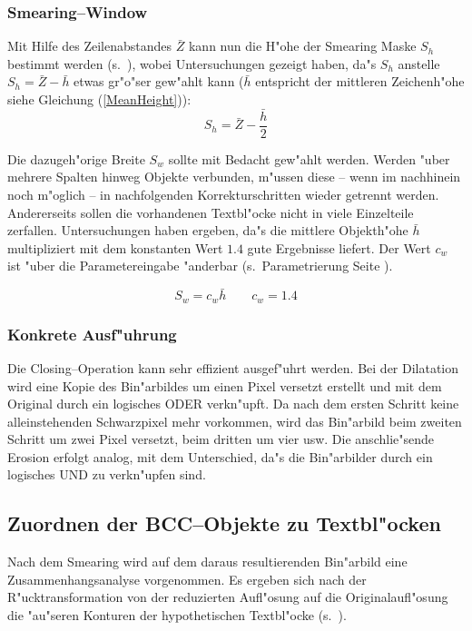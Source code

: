 

\subsubsection{Smearing--Window}

Mit Hilfe des Zeilenabstandes $\bar{Z}$ kann nun die H"ohe der Smearing Maske $S_h$
bestimmt werden (s.\ ), wobei Untersuchungen gezeigt haben, da"s
$S_h$ anstelle $S_h = \bar{Z} - \bar{h}$ etwas gr"o"ser gew"ahlt kann
($\bar{h}$ entspricht der mittleren Zeichenh"ohe siehe Gleichung (\ref{MeanHeight})):
$$S_h = \bar{Z} - \frac{\bar{h}}{2}$$


Die dazugeh"orige Breite $S_w$ sollte mit Bedacht gew"ahlt werden. Werden "uber mehrere
Spalten hinweg Objekte verbunden, m"ussen diese -- wenn im nachhinein noch m"oglich -- in nachfolgenden
Korrekturschritten wieder getrennt werden. Andererseits sollen die vorhandenen
Textbl"ocke nicht in viele Einzelteile zerfallen.
Untersuchungen haben ergeben, da"s die mittlere Objekth"ohe $\bar{h}$ multipliziert mit
dem konstanten Wert $1.4$ gute Ergebnisse liefert. Der Wert $c_w$ ist "uber die
Parametereingabe "anderbar (s.\ Parametrierung  Seite
\pageref{eps:ParameterPanelBottomUp}).

$$S_w = c_w  \bar{h}\qquad c_w = 1.4$$

\subsubsection{Konkrete Ausf"uhrung}

Die Closing--Operation kann sehr effizient ausgef"uhrt werden. Bei der Dilatation wird eine
Kopie des Bin"arbildes um einen Pixel versetzt erstellt und mit dem Original durch ein
logisches ODER verkn"upft.
Da nach dem ersten Schritt keine alleinstehenden Schwarzpixel mehr vorkommen, wird das
Bin"arbild beim zweiten Schritt um zwei Pixel versetzt, beim dritten um vier usw. Die
anschlie"sende Erosion erfolgt analog, mit dem Unterschied, da"s die Bin"arbilder durch ein
logisches UND zu verkn"upfen sind.

\subsection{Zuordnen der BCC--Objekte zu Textbl"ocken}
Nach dem Smearing wird auf dem daraus resultierenden Bin"arbild eine Zusammenhangsanalyse
vorgenommen. Es ergeben sich nach der R"ucktransformation von der reduzierten Aufl"osung
auf die Originalaufl"osung die "au"seren Konturen der hypothetischen Textbl"ocke
(s.\ ).

